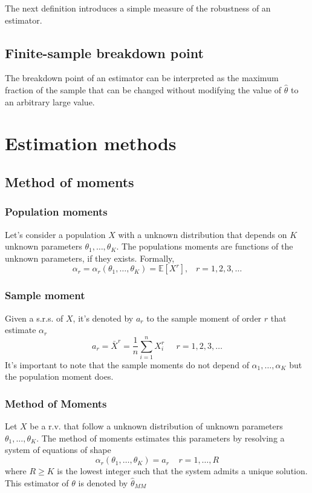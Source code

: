 The next definition introduces a simple measure of the robustness of an
estimator.

\subsection{Finite-sample breakdown point}
The breakdown point of an estimator can be interpreted as the maximum fraction
of the sample that can be changed without modifying the value of $\hat{\theta}$
to an arbitrary large value.


\section{Estimation methods}
\subsection{Method of moments}
\subsubsection{Population moments}
Let's consider a population $X$ with a unknown distribution that depends on $K$
unknown parameters $\theta_1,\dots,\theta_K$. The populations moments are
functions of the unknown parameters, if they exists. Formally,
\[ \alpha_r = \alpha_r(\theta_1,\dots,\theta_K) = \mathbb{E}[X^r],\;\;\;
r=1,2,3,\dots \]

\subsubsection{Sample moment}
Given a s.r.s. of $X$, it's denoted by $a_r$ to the sample moment of order $r$
that estimate $\alpha_r$
\[ a_r = \bar{X}^r = \frac{1}{n}\sum_{i=1}^n X^r_i\;\;\;\;\;r=1,2,3,\dots\] It's
important to note that the sample moments do not depend of
$\alpha_1,\dots,\alpha_K$ but the population moment does. 

\subsubsection{Method of Moments}
Let $X$ be a r.v. that follow a unknown distribution of unknown parameters
$\theta_1,\dots,\theta_K$. The method of moments estimates this parameters by
resolving a system of equations of shape
\[ \alpha_r(\theta_1,\dots,\theta_K) = a_r\;\;\;\; r=1,\dots,R \] where $R \geq
K$ is the lowest integer such that the system admits a unique solution. This
estimator of $\theta$ is denoted by $\hat{\theta}_{MM}$

